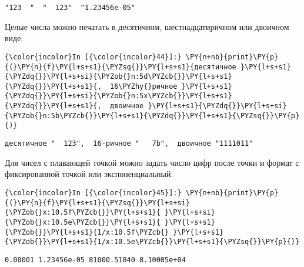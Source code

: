     \begin{Verbatim}[commandchars=\\\{\}]
"123  "  "  123"  "1.23456e-05"

    \end{Verbatim}

    Целые числа можно печатать в десятичном, шестнадцатиричном или двоичном
виде.

    \begin{Verbatim}[commandchars=\\\{\}]
{\color{incolor}In [{\color{incolor}44}]:} \PY{n+nb}{print}\PY{p}{(}\PY{n}{f}\PY{l+s+s1}{\PYZsq{}}\PY{l+s+s1}{десятичное }\PY{l+s+s1}{\PYZdq{}}\PY{l+s+si}{\PYZob{}n:5d\PYZcb{}}\PY{l+s+s1}{\PYZdq{}}\PY{l+s+s1}{,  16\PYZhy{}ричное }\PY{l+s+s1}{\PYZdq{}}\PY{l+s+si}{\PYZob{}n:5x\PYZcb{}}\PY{l+s+s1}{\PYZdq{}}\PY{l+s+s1}{,  двоичное }\PY{l+s+s1}{\PYZdq{}}\PY{l+s+si}{\PYZob{}n:5b\PYZcb{}}\PY{l+s+s1}{\PYZdq{}}\PY{l+s+s1}{\PYZsq{}}\PY{p}{)}
\end{Verbatim}

    \begin{Verbatim}[commandchars=\\\{\}]
десятичное "  123",  16-ричное "   7b",  двоичное "1111011"

    \end{Verbatim}

    Для чисел с плавающей точкой можно задать число цифр после точки и
формат с фиксированной точкой или экспоненциальный.

    \begin{Verbatim}[commandchars=\\\{\}]
{\color{incolor}In [{\color{incolor}45}]:} \PY{n+nb}{print}\PY{p}{(}\PY{n}{f}\PY{l+s+s1}{\PYZsq{}}\PY{l+s+si}{\PYZob{}x:10.5f\PYZcb{}}\PY{l+s+s1}{ }\PY{l+s+si}{\PYZob{}x:10.5e\PYZcb{}}\PY{l+s+s1}{ }\PY{l+s+s1}{\PYZob{}}\PY{l+s+s1}{1/x:10.5f\PYZcb{} }\PY{l+s+s1}{\PYZob{}}\PY{l+s+s1}{1/x:10.5e\PYZcb{}}\PY{l+s+s1}{\PYZsq{}}\PY{p}{)}
\end{Verbatim}

    \begin{Verbatim}[commandchars=\\\{\}]
   0.00001 1.23456e-05 81000.51840 8.10005e+04

    \end{Verbatim}
